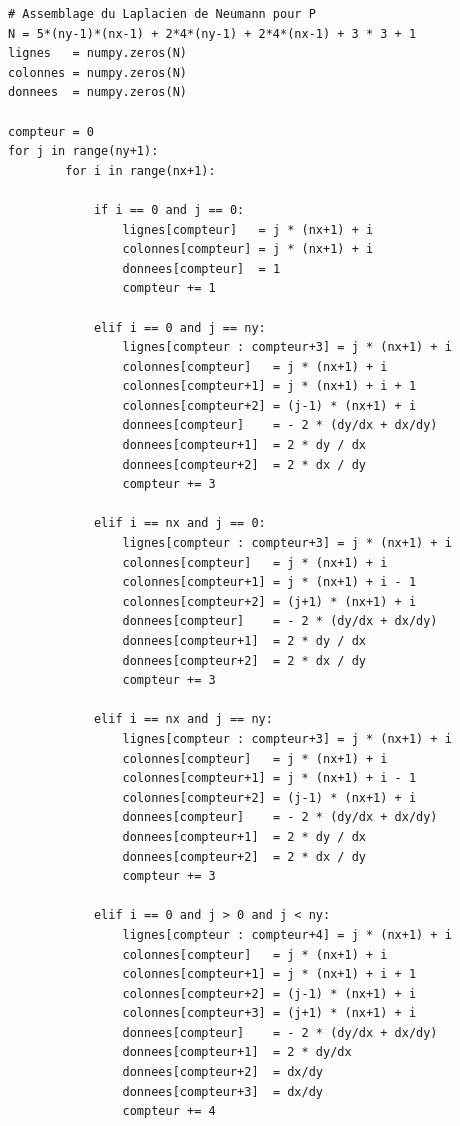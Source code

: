 \begin{verbatim}
# Assemblage du Laplacien de Neumann pour P
N = 5*(ny-1)*(nx-1) + 2*4*(ny-1) + 2*4*(nx-1) + 3 * 3 + 1
lignes   = numpy.zeros(N)
colonnes = numpy.zeros(N)
donnees  = numpy.zeros(N)

compteur = 0
for j in range(ny+1):
        for i in range(nx+1):
        
            if i == 0 and j == 0:
                lignes[compteur]   = j * (nx+1) + i
                colonnes[compteur] = j * (nx+1) + i
                donnees[compteur]  = 1
                compteur += 1
        
            elif i == 0 and j == ny:
                lignes[compteur : compteur+3] = j * (nx+1) + i
                colonnes[compteur]   = j * (nx+1) + i
                colonnes[compteur+1] = j * (nx+1) + i + 1
                colonnes[compteur+2] = (j-1) * (nx+1) + i
                donnees[compteur]    = - 2 * (dy/dx + dx/dy)
                donnees[compteur+1]  = 2 * dy / dx
                donnees[compteur+2]  = 2 * dx / dy
                compteur += 3
            
            elif i == nx and j == 0:
                lignes[compteur : compteur+3] = j * (nx+1) + i
                colonnes[compteur]   = j * (nx+1) + i
                colonnes[compteur+1] = j * (nx+1) + i - 1
                colonnes[compteur+2] = (j+1) * (nx+1) + i
                donnees[compteur]    = - 2 * (dy/dx + dx/dy)
                donnees[compteur+1]  = 2 * dy / dx
                donnees[compteur+2]  = 2 * dx / dy
                compteur += 3

            elif i == nx and j == ny:
                lignes[compteur : compteur+3] = j * (nx+1) + i
                colonnes[compteur]   = j * (nx+1) + i
                colonnes[compteur+1] = j * (nx+1) + i - 1
                colonnes[compteur+2] = (j-1) * (nx+1) + i
                donnees[compteur]    = - 2 * (dy/dx + dx/dy)
                donnees[compteur+1]  = 2 * dy / dx
                donnees[compteur+2]  = 2 * dx / dy
                compteur += 3
    
            elif i == 0 and j > 0 and j < ny:
                lignes[compteur : compteur+4] = j * (nx+1) + i
                colonnes[compteur]   = j * (nx+1) + i
                colonnes[compteur+1] = j * (nx+1) + i + 1
                colonnes[compteur+2] = (j-1) * (nx+1) + i
                colonnes[compteur+3] = (j+1) * (nx+1) + i
                donnees[compteur]    = - 2 * (dy/dx + dx/dy)
                donnees[compteur+1]  = 2 * dy/dx
                donnees[compteur+2]  = dx/dy
                donnees[compteur+3]  = dx/dy
                compteur += 4


\end{verbatim}
